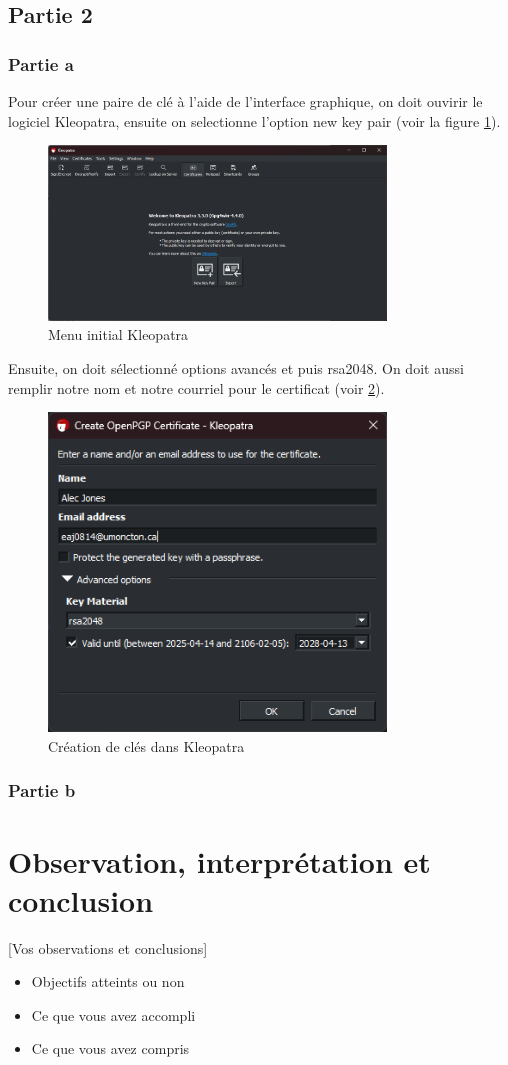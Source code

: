 \documentclass[12pt,a4paper]{article}
\begin{document}
\subsection{Partie 2}
\subsubsection{Partie a}
Pour créer une paire de clé à l'aide de l'interface graphique, on doit ouvirir le logiciel
Kleopatra, ensuite on selectionne l'option new key pair (voir la figure \ref{kleopatra}).

\begin{figure}[h]
    \centering
    \includegraphics[width=0.8\textwidth]{../img/kleopatra.png}
    \caption{Menu initial Kleopatra}
    \label{kleopatra}
\end{figure}

Ensuite, on doit sélectionné options avancés et puis rsa2048.
On doit aussi remplir notre nom et notre courriel pour le certificat (voir \ref{newKey}).

\begin{figure}[ht]
    \centering
    \includegraphics[width=0.8\textwidth]{../img/newKey.png}
    \caption{Création de clés dans Kleopatra}
    \label{newKey}
\end{figure}

\subsubsection{Partie b}


\section{Observation, interprétation et conclusion}
 [Vos observations et conclusions]
\begin{itemize}
    \item Objectifs atteints ou non
    \item Ce que vous avez accompli
    \item Ce que vous avez compris
\end{itemize}
\end{document}

